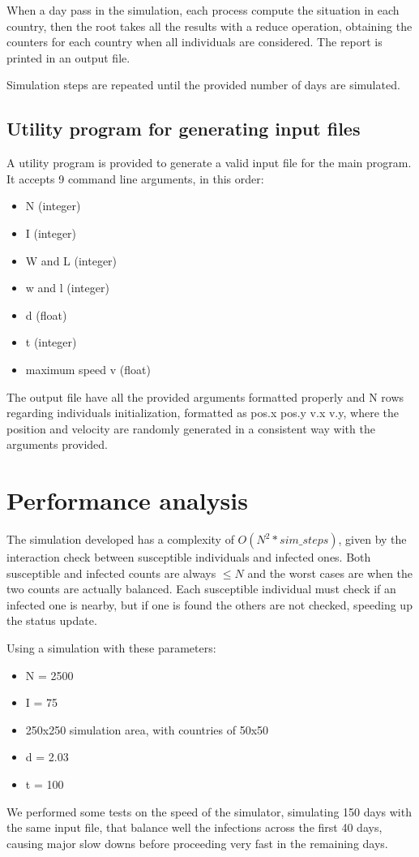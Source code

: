 \documentclass[10pt]{article}
\begin{document}
	When a day pass in the simulation, each process compute the situation in each country, then the root takes all the results with a reduce operation, obtaining the counters for each country when all individuals are considered. The report is printed in an output file.
	
	Simulation steps are repeated until the provided number of days are simulated.
	 
	
	\subsection{Utility program for generating input files} \label{utility}
	A utility program is provided to generate a valid input file for the main program. It accepts 9 command line arguments, in this order:
	\begin{itemize}
		\item N (integer)
		\item I (integer)
		\item W and L (integer)
		\item w and l (integer)
		\item d (float)
		\item t (integer)
		\item maximum speed v (float)
	\end{itemize}

	The output file have all the provided arguments formatted properly and N rows regarding individuals initialization, formatted as {pos.x pos.y v.x v.y}, where the position and velocity are randomly generated in a consistent way with the arguments provided.

	
	\section{Performance analysis}
	The simulation developed has a complexity of $ O(N^2 * sim\_steps) $, given by the interaction check between susceptible individuals and infected ones. Both susceptible and infected counts are always $ \le N $ and the worst cases are when the two counts are actually balanced. Each susceptible individual must check if an infected one is nearby, but if one is found the others are not checked, speeding up the status update.
	
	Using a simulation with these parameters:
	\begin{itemize}
		\item N = 2500
		\item I = 75
		\item 250x250 simulation area, with countries of 50x50
		\item d = 2.03
		\item t = 100
	\end{itemize}
	We performed some tests on the speed of the simulator, simulating 150 days with the same input file, that balance well the infections across the first 40 days, causing major slow downs before proceeding very fast in the remaining days.
	
\end{document}
